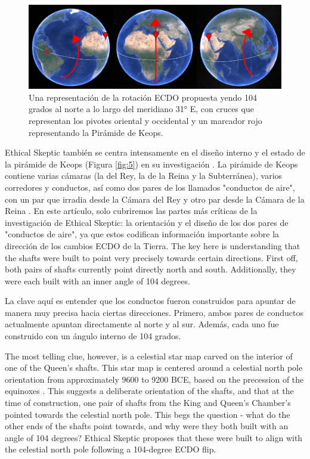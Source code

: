 \documentclass[10pt,twocolumn,letterpaper]{article}
\begin{document}
\begin{figure}[b]
\begin{center}
\includegraphics[width=1\textwidth]{drawing.jpg}
\end{center}
   \caption{Una representación de la rotación ECDO propuesta yendo 104 grados al norte a lo largo del meridiano 31° E, con cruces que representan los pivotes oriental y occidental y un marcador rojo representando la Pirámide de Keops.}
\label{fig:6}
\end{figure}

Ethical Skeptic también se centra intensamente en el diseño interno y el estado de la pirámide de Keops (Figura \ref{fig:5}) en su investigación \cite{28}. La pirámide de Keops contiene varias cámaras (la del Rey, la de la Reina y la Subterránea), varios corredores y conductos, así como dos pares de los llamados "conductos de aire", con un par que irradia desde la Cámara del Rey y otro par desde la Cámara de la Reina \cite{29,30}. En este artículo, solo cubriremos las partes más críticas de la investigación de Ethical Skeptic: la orientación y el diseño de los dos pares de "conductos de aire", ya que estos codifican información importante sobre la dirección de los cambios ECDO de la Tierra.
The key here is understanding that the shafts were built to point very precisely towards certain directions. First off, both pairs of shafts currently point directly north and south. Additionally, they were each built with an inner angle of 104 degrees.

La clave aquí es entender que los conductos fueron construidos para apuntar de manera muy precisa hacia ciertas direcciones. Primero, ambos pares de conductos actualmente apuntan directamente al norte y al sur. Además, cada uno fue construido con un ángulo interno de 104 grados.

The most telling clue, however, is a celestial star map carved on the interior of one of the Queen's shafts. This star map is centered around a celestial north pole orientation from approximately 9600 to 9200 BCE, based on the precession of the equinoxes \cite{28}. This suggests a deliberate orientation of the shafts, and that at the time of construction, one pair of shafts from the King and Queen's Chamber's pointed towards the celestial north pole. This begs the question - what do the other ends of the shafts point towards, and why were they both built with an angle of 104 degrees? Ethical Skeptic proposes that these were built to align with the celestial north pole following a 104-degree ECDO flip.
\end{document}
